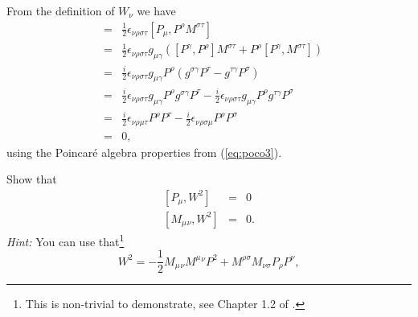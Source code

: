 \documentclass[notes.tex]{subfiles}
\begin{document}
\begin{Answer} 
From the definition of $W_\nu$ we have
\begin{eqnarray*}
[P_\mu,W_\nu] &=& \frac{1}{2}\epsilon_{\nu\rho\sigma\tau}[P_\mu,P^\rho M^{\sigma\tau}] \\
&=& \frac{1}{2}\epsilon_{\nu\rho\sigma\tau}g_{\mu\gamma}([P^\gamma,P^\rho]M^{\sigma\tau} + P^\rho[P^\gamma, M^{\sigma\tau}] )\\
&=& \frac{i}{2}\epsilon_{\nu\rho\sigma\tau}g_{\mu\gamma}P^\rho(g^{\sigma\gamma} P^\tau-g^{\tau\gamma}P^\sigma)\\
&=& \frac{i}{2}\epsilon_{\nu\rho\sigma\tau}g_{\mu\gamma}P^\rho g^{\sigma\gamma} P^\tau-\frac{i}{2}\epsilon_{\nu\rho\sigma\tau}g_{\mu\gamma}P^\rho g^{\tau\gamma}P^\sigma\\
&=& \frac{i}{2}\epsilon_{\nu\rho\mu\tau}P^\rho  P^\tau-\frac{i}{2}\epsilon_{\nu\rho\sigma\mu}P^\rho P^\sigma\\
&=& 0,
\end{eqnarray*}
using the Poincaré algebra properties from (\ref{eq:poco3}).
\end{Answer}


\begin{Exercise}[]
Show that
\begin{eqnarray}
\left[P_\mu, W^2\right] &=& 0 \\
\left[M_\mu{}_\nu, W^2\right] &=& 0.
\end{eqnarray}
{\it Hint:} You can use that\footnote{This is non-trivial to demonstrate, see Chapter 1.2 of \cite{IntrSUSY2010}.}
 \[W^2 = -\frac{1}{2} M_\mu{}_\nu M^{\mu}{}^{\nu}P^2 + M^{\rho\sigma}M_{\nu\sigma}P_\rho P^\nu, \]
\end{Exercise}
\end{document}
